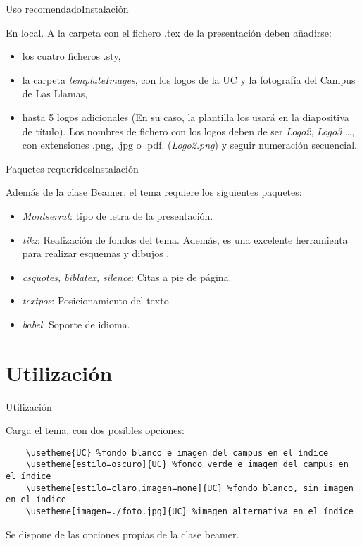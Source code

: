 \documentclass[handout,%
		aspectratio=43,%
		9pt]{beamer}
\begin{document}
\begin{frame}{Uso recomendado}{Instalación}

En local. A la carpeta con el fichero .tex de la presentación deben añadirse:

\begin{itemize}
\item los cuatro ficheros .sty,
\item la carpeta \textit{templateImages}, con los logos de la UC y la fotografía del Campus de Las Llamas,
\item hasta 5 logos adicionales (En su caso, la plantilla los usará en la diapositiva de título). Los nombres de fichero con los logos deben de ser \textit{Logo2}, \textit{Logo3} \ldots, con extensiones .png, .jpg o .pdf. (\textit{Logo2.png}) y seguir numeración secuencial.
\end{itemize}
\end{frame}

\begin{frame}{Paquetes requeridos}{Instalación}

Además de la clase Beamer, el tema requiere los siguientes paquetes: 

\begin{itemize}
\item \textit{Montserrat}: tipo de letra de la presentación.
\item \textit{tikz}: Realización de fondos del tema. Además, es una excelente herramienta para realizar esquemas y dibujos .
\item \textit{csquotes, biblatex, silence}: Citas a pie de página.
\item \textit{textpos}: Posicionamiento del texto. 
\item \textit{babel}: Soporte de idioma.
\end{itemize}

\end{frame}

\section{Utilización}
\begin{frame}[fragile]{Utilización}

Carga el tema, con dos posibles opciones:

{\scriptsize
\begin{verbatim}
	\usetheme{UC} %fondo blanco e imagen del campus en el índice
	\usetheme[estilo=oscuro]{UC} %fondo verde e imagen del campus en el índice
	\usetheme[estilo=claro,imagen=none]{UC} %fondo blanco, sin imagen en el índice
	\usetheme[imagen=./foto.jpg]{UC} %imagen alternativa en el índice
\end{verbatim}
}

Se dispone de las opciones propias de la clase beamer.


\end{frame}
\end{document}
